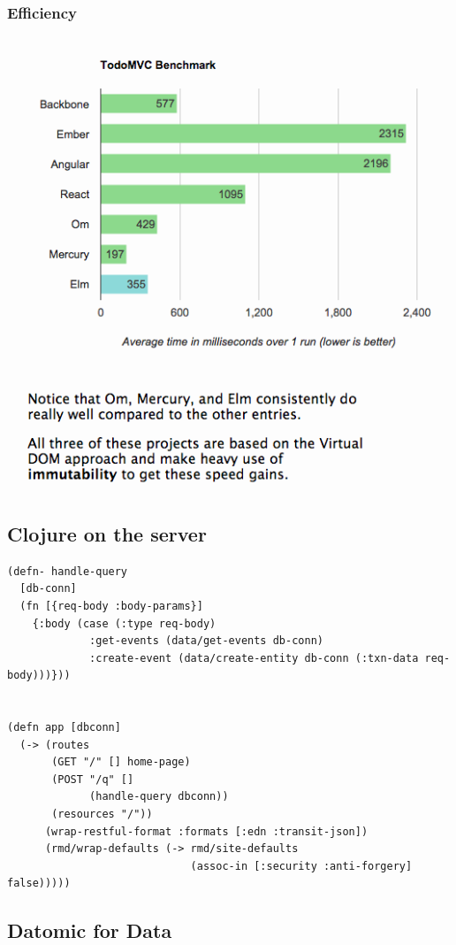 \documentclass[11pt]{article}
\begin{document}
\subsubsection*{Efficiency}
\label{sec:orgheadline21}

\includegraphics[width=.9\linewidth]{./todomvc-perf-comparison.png}

\subsection*{Clojure on the server}
\label{sec:orgheadline23}

\begin{verbatim}
(defn- handle-query
  [db-conn]
  (fn [{req-body :body-params}]
    {:body (case (:type req-body)
             :get-events (data/get-events db-conn)
             :create-event (data/create-entity db-conn (:txn-data req-body)))}))


(defn app [dbconn]
  (-> (routes
       (GET "/" [] home-page)
       (POST "/q" []
             (handle-query dbconn))
       (resources "/"))
      (wrap-restful-format :formats [:edn :transit-json])
      (rmd/wrap-defaults (-> rmd/site-defaults
                             (assoc-in [:security :anti-forgery] false)))))
\end{verbatim}

\subsection*{Datomic for Data}
\label{sec:orgheadline27}
\end{document}
